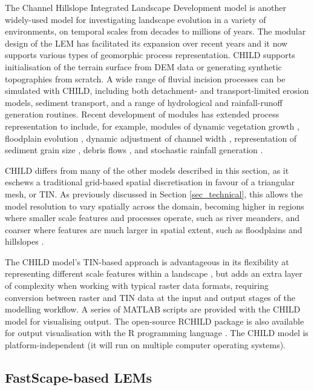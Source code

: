 The Channel Hillslope Integrated Landscape Development model \citep[CHILD,][]{tucker2001child} is another widely-used model for investigating landscape evolution in a variety of environments, on temporal scales from decades to millions of years. The modular design of the LEM has facilitated its expansion over recent years and it now supports various types of geomorphic process representation. CHILD supports initialisation of the terrain surface from DEM data or generating synthetic topographies from scratch. A wide range of fluvial incision processes can be simulated with CHILD, including both detachment- and transport-limited erosion models, sediment transport, and a range of hydrological and rainfall-runoff generation routines. Recent development of modules has extended process representation to include, for example, modules of dynamic vegetation growth \citep{Collins2004}, floodplain evolution \citep{Clevis2006}, dynamic adjustment of channel width \citep{Attal2008}, representation of sediment grain size \citep{Gasparini2004}, debris flows \citep{Lancaster2003}, and stochastic rainfall generation \citep{Tucker2000}.

CHILD differs from many of the other models described in this section, as it eschews a traditional grid-based spatial discretisation in favour of a triangular mesh, or TIN. As previously discussed in Section \ref{sec_technical}, this allows the model resolution to vary spatially across the domain, becoming higher in regions where smaller scale features and processes operate, such as river meanders, and coarser where features are much larger in spatial extent, such as floodplains and hillslopes \citep{Tucker2001}. 

The CHILD model’s TIN-based approach is advantageous in its flexibility at representing different scale features within a landscape \citep{Braun1997,tucker2001child}, but adds an extra layer of complexity when working with typical raster data formats, requiring conversion between raster and TIN data at the input and output stages of the modelling workflow. A series of MATLAB scripts are provided with the CHILD model for visualising output. The open-source RCHILD package is also available for output visualisation with the R programming language \citep{dietze2014rchild}. The CHILD model is platform-independent (it will run on multiple computer operating systems).

\subsection{FastScape-based LEMs}

